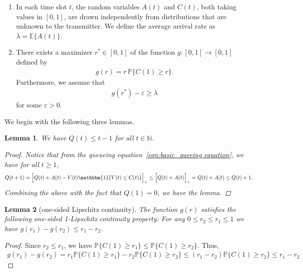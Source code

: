 \documentclass[12pt,draftcls, onecolumn]{IEEEtran}
\newtheorem{lemma}{Lemma}
\begin{document}
\begin{enumerate}
    \item[\textbf{A1}] In each time slot \(t\), the random variables \(A(t)\) and \(C(t)\), both taking values in \([0,1]\), are drawn independently from distributions that are unknown to the transmitter. We define the average arrival rate as \(\lambda = \mathbb{E}\{A(t)\}\).

    \item[\textbf{A2}] There exists a maximizer \(r^* \in [0,1]\) of the function \(g : [0,1] \to [0,1]\) defined by
    \begin{align}\label{eqn:g_def}
        g(r) = r \, \mathbb{P}\{C(1) \geq r\}.
    \end{align}
    Furthermore, we assume that
    \begin{align*}
        g(r^*) - \varepsilon \geq \lambda
    \end{align*}
    for some \(\varepsilon > 0\).
\end{enumerate}
We begin with the following three lemmas.
\begin{lemma}\label{eqn:det_queue_bound}
    We have $Q(t) \leq t-1$ for all $t \in \mathbb{N}$. 
    \begin{proof}
        Notice that from the queueing equation~\eqref{eqn:basic_queeing equation}, we have for all $t \geq 1$,
        \begin{align}
             Q(t+1) = \Bigl[Q(t) + A(t) - V(t)\mathbbm{1}\{V(t) \leq C(t)\}\Bigr]_+ \leq \Bigl[Q(t) + A(t)\Bigr]_+ = Q(t) + A(t) \leq Q(t)+1. \nonumber
        \end{align}
        Combining the above with the fact that $Q(1) = 0$, we have the lemma.
    \end{proof}
\end{lemma}
\begin{lemma}[one-sided Lipschitz continuity]\label{lem:lip}
The function $g(r)$ satisfies the following one-sided 1-Lipschitz continuity property: For any $0\leq r_2\leq r_1\leq 1$ we have $g(r_1) - g(r_2) \leq r_1 - r_2$.
\end{lemma}
\begin{proof}
 Since $ r_2\leq r_1$, we have $\mathbb{P}\{C(1) \geq r_1\}\leq\mathbb{P}\{C(1) \geq r_2\}$. Thus, 
 \begin{align}
 g(r_1) - g(r_2) = r_1\mathbb{P}\{C(1) \geq r_1\}- r_2\mathbb{P}\{C(1) \geq r_2\}  \leq (r_1-r_2)\mathbb{P}\{C(1) \geq r_2\} \leq r_1 - r_2 \nonumber
 \end{align}
\end{proof}
\end{document}
